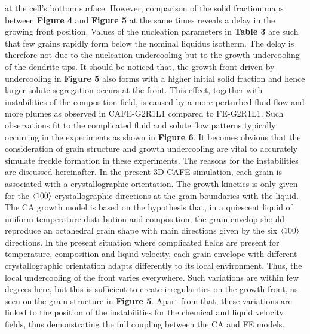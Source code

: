 at the cell’s bottom surface. However, comparison of the solid fraction maps between \textbf{Figure 4} and \textbf{Figure 5} at the 
same times reveals a delay in the growing front position. Values of the nucleation parameters in \textbf{Table 3} are such 
that few grains rapidly form below the nominal liquidus isotherm. The delay is therefore not due to the nucleation 
undercooling but to the growth undercooling of the dendrite tips. It should be noticed that, the growth front driven 
by undercooling in \textbf{Figure 5} also forms with a higher initial solid fraction and hence larger solute segregation occurs 
at the front. This effect, together with instabilities of the composition field, is caused by a more perturbed fluid flow 
and more plumes as observed in CAFE-G2R1L1 compared to FE-G2R1L1. Such observations fit to the complicated fluid and solute 
flow patterns typically occurring in the experiments as shown in \textbf{Figure 6}. It becomes obvious that the consideration of grain 
structure and growth undercooling are vital to accurately simulate freckle formation in these experiments. The reasons for the 
instabilities are discussed hereinafter. In the present 3D CAFE simulation, each grain is associated with a crystallographic orientation. 
The growth kinetics is only given for the $\langle 100 \rangle$ crystallographic directions at the grain boundaries with the liquid. The CA growth model 
is based on the hypothesis that, in a quiescent liquid of uniform temperature distribution and composition, the grain envelop should 
reproduce an octahedral grain shape with main directions given by the six $\langle 100 \rangle$ directions. In the present situation where complicated 
fields are present for temperature, composition and liquid velocity, each grain envelope with different crystallographic orientation 
adapts differently to its local environment. Thus, the local undercooling of the front varies everywhere. Such variations are within 
few degrees here, but this is sufficient to create irregularities on the growth front, as seen on the grain structure in \textbf{Figure 5}. 
Apart from that, these variations are linked to the position of the instabilities for the chemical and liquid velocity fields, thus 
demonstrating the full coupling between the CA and FE models.
%
%
